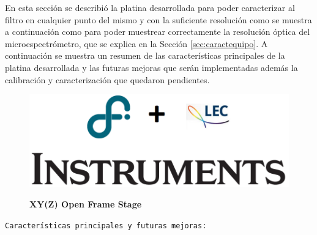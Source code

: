 En esta sección se describió la platina desarrollada para poder caracterizar al filtro en cualquier punto del mismo y con la suficiente resolución como se muestra a continuación como para poder muestrear correctamente la resolución óptica del microespectrómetro, que se explica en la Sección \ref{sec:caractequipo}. A continuación se muestra un resumen de las características principales de la platina desarrollada y las futuras mejoras que serán implementadas además la calibración y caracterización que quedaron pendientes.

\newpage
\begin{figure}[H]
\begin{minipage}{0.47\textwidth}
\centering
\includegraphics[width=.7\textwidth,left]{Figs/microespectrometro/descarga.png}
\end{minipage}
\hfill
\begin{minipage}{0.47\textwidth}
\raggedleft
\Huge \textbf{XY(Z) Open Frame Stage}
\end{minipage}
\end{figure}

\texttt{Características principales y futuras mejoras:}

